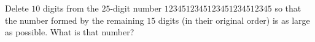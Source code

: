 Delete $10$ digits from the $25$-digit number $1234512345123451234512345$ so that the number formed by the remaining $15$ digits (in their original order) is as large as possible. What is that number?
